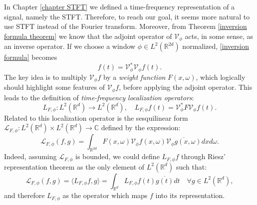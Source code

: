 \documentclass[corpo=11pt, stile=classica, tipotesi=custom,
greek, evenboxes, english]{toptesi}
\numberwithin{equation}{chapter}
\theoremstyle{definition}
\theoremstyle{remark}
\newcommand{\R}{\mathbb{R}} %
\newcommand{\V}{\mathcal{V}} %
\newcommand{\C}{\mathbb{C}} %
\renewcommand{\L}{\mathscr{L}} %
\begin{document}
In Chapter \ref{chapter STFT} we defined a time-frequency representation of a signal, namely the STFT. Therefore, to reach our goal, it seems more natural to use STFT instead of the Fourier transform. Moreover, from Theorem \ref{inversion formula theorem} we know that the adjoint operator of $\V_{\phi}$ acts, in some sense, as an inverse operator. If we choose a window $\phi \in L^2(\R^{2d})$ normalized, \ref{inversion formula} becomes
\begin{equation*}
	f(t) = \V_{\phi}^* \V_{\phi}f(t).
\end{equation*}
The key idea is to multiply $\V_{\phi} f$ by a \emph{weight function} $F(x,\omega)$, which logically should highlight some features of $\V_{\phi}f$, before applying the adjoint operator. This leads to the definition of \emph{time-frequency localization operators}:
\begin{equation}\label{Daubechies' localization operator def}
	L_{F,\phi} : L^2(\R^d) \rightarrow L^2(\R^d), \quad L_{F,\phi}f(t) = \V_{\phi}^* F \V_{\phi} f(t).
\end{equation}
Related to this localization operator is the sesquilinear form $\L_{F,\phi} : L^2(\R^d) \times L^2(\R^d) \rightarrow \C$ defined by the expression:
\begin{equation}\label{sesquilinear form localization operator}
	\L_{F,\phi}(f,g) = \int_{\R^{2d}} F(x,\omega) \V_{\phi}f(x,\omega) \overline{\V_{\phi}g(x,\omega)} dxd\omega.
\end{equation}
Indeed, assuming $\L_{F,\phi}$ is bounded, we could define $ L_{F,\phi} f$ through Riesz' representation theorem as the only element of $L^2(\R^d)$ such that:
\begin{equation}\label{L_F through duality}
	\L_{F,\phi}(f,g) = \langle L_{F,\phi}f,g \rangle  = \int_{\R^d} L_{F,\phi}f(t) \overline{g(t)}dt \quad \forall g \in L^2(\R^d),
\end{equation}
and therefore $L_{F,\phi}$ as the operator which maps $f$ into its representation.
\end{document}
